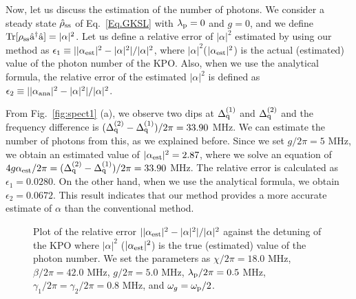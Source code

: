 
Now, let us discuss the estimation of the number of photons.
We consider a steady state $\hat{\rho}_{\rm{ss}}$ of Eq.~\eqref{Eq.GKSL} with $\lambda_{\rm{p}}=0$ and $g=0$, and we define $\rm{Tr}[\rho_{\rm{ss}}\hat{a}^\dagger\hat{a}]=|\alpha|^2$.
Let us define a
 relative error of $|\alpha|^2$ estimated by using our method as $\epsilon_1\equiv||\alpha_{\rm{est}}|^2-|\alpha|^2|/|\alpha|^2$, where $|\alpha|^2$($|\alpha_{\rm{est}}|^2$) is the actual (estimated) value of the photon number of the KPO.
Also, when we use the analytical formula, the relative error of the estimated $|\alpha|^2$ is
defined as $\epsilon_2\equiv||\alpha_{\rm{ana}}|^2-|\alpha|^2|/|\alpha|^2$.

From Fig.~\ref{fig:spect1} (a), we observe two dips at
$\Delta ^{(1)}_{\rm{q}}$ and $\Delta ^{(2)}_{\rm{q}}$ and the frequency difference is $(\Delta ^{(2)}_{\rm{q}}-\Delta ^{(1)}_{\rm{q}})/2\pi=33.90$ MHz. We can estimate the number of photons from this, as we explained before.
Since we set $g/2\pi=5$ MHz, 
we obtain an estimated value of 
$|\alpha _{\rm{est}}|^2= 2.87$,
where we solve an equation of $4g\alpha _{\rm{est}}/2\pi=(\Delta ^{(2)}_{\rm{q}}-\Delta ^{(1)}_{\rm{q}})/2\pi=33.90$ MHz.
The relative error is calculated as
$\epsilon_1=0.0280$.
On the other hand, when we use the analytical formula, we obtain $\epsilon_2=0.0672$.
This result indicates that our method provides a more accurate estimate of $\alpha$ than the conventional method. 


\begin{figure}%
\centering
\caption{
Plot of the relative error $||\alpha_{\rm{est}}|^2-|\alpha|^2|/|\alpha|^2$ 
against the detuning of the KPO
 where $|\alpha|^2$ ($|\alpha_{\rm{est}}|^2$) is the true (estimated) value of the photon number.
 We set the parameters as $\chi/2\pi=18.0$ MHz, $\beta/2\pi=42.0$ MHz, $g/2\pi=5.0$ MHz, $\lambda_{\rm{p}}/2\pi=0.5$ MHz, $\gamma_1/2\pi=\gamma_2/2\pi=0.8$ MHz, and $\omega_g=\omega_{\rm{p}}/2$.
}
\label{fig:spec_error1}
\end{figure}

